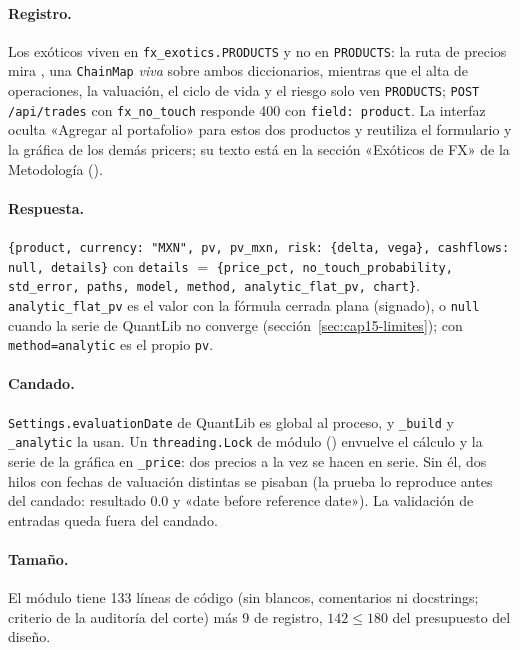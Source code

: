 \paragraph{Registro.} Los exóticos viven en \texttt{fx\_exotics.PRODUCTS} y no en \texttt{PRODUCTS}: la ruta de precios mira
, una \texttt{ChainMap} \emph{viva} sobre ambos diccionarios, mientras que el alta de
operaciones, la valuación, el ciclo de vida y el riesgo solo ven \texttt{PRODUCTS}; \texttt{POST /api/trades} con
\texttt{fx\_no\_touch} responde 400 con \texttt{field: product}. La interfaz oculta «Agregar al portafolio» para estos dos productos y reutiliza el formulario y la
gráfica de los demás pricers; su texto está en la sección «Exóticos de FX» de la Metodología
().

\paragraph{Respuesta.} \texttt{\{product, currency: "MXN", pv, pv\_mxn, risk: \{delta, vega\}, cashflows: null, details\}} con
\texttt{details} $=$ \texttt{\{price\_pct, no\_touch\_probability, std\_error, paths, model, method, analytic\_flat\_pv, chart\}}.
\texttt{analytic\_flat\_pv} es el valor con la fórmula cerrada plana (signado), o \texttt{null} cuando la serie de QuantLib no converge
(sección~\ref{sec:cap15-limites}); con \texttt{method=analytic} es el propio \texttt{pv}.

\paragraph{Candado.} \texttt{Settings.evaluationDate} de QuantLib es global al proceso, y \texttt{\_build} y \texttt{\_analytic} la usan. Un
\texttt{threading.Lock} de módulo () envuelve el cálculo y la serie de la gráfica
en \texttt{\_price}: dos precios a la vez se hacen en serie. Sin él, dos hilos con fechas de valuación distintas se pisaban
(la prueba lo reproduce antes del candado: resultado $0.0$ y «date before reference date»). La validación de entradas queda fuera del candado.

\paragraph{Tamaño.} El módulo tiene 133 líneas de código (sin blancos, comentarios ni docstrings; criterio de la auditoría del corte) más 9 de
registro, $142\le180$ del presupuesto del diseño.

